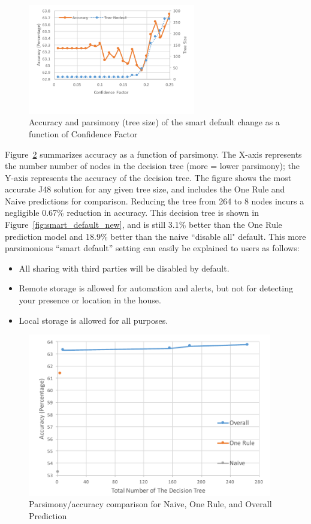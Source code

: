 \begin{figure}
	\centering
	\includegraphics[width=0.65\textwidth]{figures/smart_default_cf.pdf}
	\caption{Accuracy and parsimony (tree size) of the smart default change as a function of Confidence Factor}
	\label{fig:smart_default_cf}
\end{figure}

Figure~\ref{fig:smart_default_optimal} summarizes accuracy as a function of parsimony. The X-axis represents the number number of nodes in the decision tree (more = lower parsimony); the Y-axis represents the accuracy of the decision tree. The figure shows the most accurate J48 solution for any given tree size, and includes the One Rule and Naive predictions for comparison. Reducing the tree from 264 to 8 nodes incurs a negligible 0.67\% reduction in accuracy. This decision tree is shown in Figure~\ref{fig:smart_default_new}, and is still 3.1\% better than the One Rule prediction model and 18.9\% better than the naive ``disable all" default. This more parsimonious ``smart default'' setting  can easily be explained to users as follows: 
\begin{itemize}
	\item All sharing with third parties will be disabled by default. 
	\item Remote storage is allowed for automation and alerts, but not for detecting your presence or location in the house. 
	\item Local storage is allowed for all purposes.
\end{itemize}


\begin{figure}
	\centering
	\includegraphics[width=0.95\textwidth]{figures/smart_default_optimal.pdf}
	\caption{Parsimony/accuracy comparison for Naive, One Rule, and Overall Prediction}
	\label{fig:smart_default_optimal}
\end{figure}

